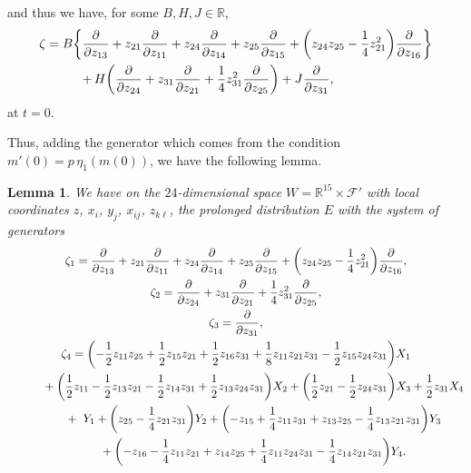 \documentclass[pdftex]{sigma}
\numberwithin{equation}{section}
\newtheorem{Lemma}[Theorem]{Lemma}
\theoremstyle{definition}
\newcommand{\R}{\mathbb{R}}
\newcommand{\0}{\boldsymbol{0}}
\newcommand{\pa}{\partial}
\begin{document}
and thus we have, for some $B, H, J \in \R$,
\begin{align*}
\zeta = B\biggl\{&{} \frac{\pa}{\pa z_{13}} + z_{21}\frac{\pa}{\pa z_{11}} + z_{24}\frac{\pa}{\pa z_{14}} +
z_{25}\frac{\pa}{\pa z_{15}} + \biggl(z_{24}z_{25} - \frac{1}{4}z_{21}^2\biggr)\frac{\pa}{\pa z_{16}}\biggr\}
\vspace{0.3truecm}
\\
&{}
{+}\, H\biggl(\frac{\pa}{\pa z_{24}} + z_{31}\frac{\pa}{\pa z_{21}} + \frac{1}{4}z_{31}^2\frac{\pa}{\pa z_{25}}\biggr) +
J\frac{\pa}{\pa z_{31}},
\end{align*}
at $t = 0$.

Thus, adding the generator which comes from the condition $m'(0) = p\,\eta_1(m(0))$, we have the following lemma.

\begin{Lemma}
\label{Generators-of-E}
We have on the $24$-dimensional
space $W = \R^{15}\times {\mathcal F}'$ with local coordinates $z$, $x_i$, $y_j$, $x_{ij}$, $z_{k\ell}$,
the prolonged distribution $E$ with the system of generators
\begin{gather*}
\zeta_1 = \frac{\pa}{\pa z_{13}} + z_{21}\frac{\pa}{\pa z_{11}} + z_{24}\frac{\pa}{\pa z_{14}} +
z_{25}\frac{\pa}{\pa z_{15}} + \biggl(z_{24}z_{25} - \frac{1}{4}z_{21}^2\biggr)\frac{\pa}{\pa z_{16}},
\\
\zeta_2 = \frac{\pa}{\pa z_{24}} + z_{31}\frac{\pa}{\pa z_{21}} + \frac{1}{4}z_{31}^2\frac{\pa}{\pa z_{25}},
\\
\zeta_3 = \frac{\pa}{\pa z_{31}},
\\
\zeta_4 = \biggl(-\frac{1}{2}z_{11}z_{25} + \frac{1}{2}z_{15}z_{21} + \frac{1}{2}z_{16}z_{31}
+ \frac{1}{8}z_{11}z_{21}z_{31} - \frac{1}{2}z_{15}z_{24}z_{31}\biggr)X_1
\\
\hphantom{\zeta_4 = \biggl(}{}
 + \biggl(\frac{1}{2}z_{11} - \frac{1}{2}z_{13}z_{21} - \frac{1}{2}z_{14}z_{31} + \frac{1}{2}z_{13}z_{24}z_{31}\biggr)X_2
+ \biggl(\frac{1}{2}z_{21} - \frac{1}{2}z_{24}z_{31}\biggr)X_3 + \frac{1}{2}z_{31}X_4
\\
\hphantom{\zeta_4 = \biggl(}{}
 + \ Y_1 + \biggl(z_{25} - \frac{1}{4}z_{21}z_{31}\biggr)Y_2 +
\biggl(-z_{15} + \frac{1}{4}z_{11}z_{31} + z_{13}z_{25} - \frac{1}{4}z_{13}z_{21}z_{31}\biggr)Y_3
\\
\hphantom{\zeta_4 = \biggl(}{}
 + \biggl(-z_{16} - \frac{1}{4}z_{11}z_{21} + z_{14}z_{25} + \frac{1}{4}z_{11}z_{24}z_{31}
- \frac{1}{4}z_{14}z_{21}z_{31}\biggr)Y_4.
\end{gather*}
\end{Lemma}
\end{document}
